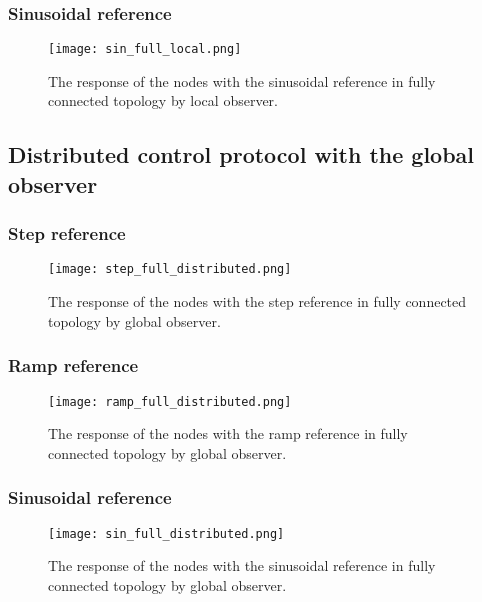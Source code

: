 \subsubsection{Sinusoidal reference}
\begin{figure}[H] %
    \centering
    \texttt{[image: sin\_full\_local.png]} %
    \caption{The response of the nodes with the sinusoidal reference in fully connected topology by local observer.}
\end{figure}

\subsection{Distributed control protocol with the global observer}
\subsubsection{Step reference}
\begin{figure}[H] %
    \centering
    \texttt{[image: step\_full\_distributed.png]} %
    \caption{The response of the nodes with the step reference in fully connected topology by global observer.}
\end{figure}


\subsubsection{Ramp reference}
\begin{figure}[H] %
    \centering
    \texttt{[image: ramp\_full\_distributed.png]} %
    \caption{The response of the nodes with the ramp reference in fully connected topology by global observer.}
\end{figure}

\subsubsection{Sinusoidal reference}
\begin{figure}[H] %
    \centering
    \texttt{[image: sin\_full\_distributed.png]} %
    \caption{The response of the nodes with the sinusoidal reference in fully connected topology by global observer.}
\end{figure}


